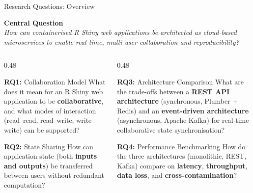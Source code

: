 \documentclass[aspectratio=169]{beamer}
\begin{document}
\begin{frame}{Research Questions: Overview}

\begin{center}
\large\textbf{Central Question}\\[0.5em]
\normalsize\textit{How can containerised R Shiny web applications be architected as cloud-based microservices to enable real-time, multi-user collaboration and reproducibility?}
\end{center}

\vspace{1em}

\begin{columns}[T]
\begin{column}{0.48\textwidth}
\begin{block}{\textbf{RQ1:} Collaboration Model}
What does it mean for an R Shiny web application to be \textbf{collaborative}, and what modes of interaction (read--read, read--write, write--write) can be supported?
\end{block}

\vspace{0.3em}
\begin{block}{\textbf{RQ2:} State Sharing}
How can application state (both \textbf{inputs and outputs}) be transferred between users without redundant computation?
\end{block}
\end{column}

\begin{column}{0.48\textwidth}
\begin{block}{\textbf{RQ3:} Architecture Comparison}
What are the trade-offs between a \textbf{REST API architecture} (synchronous, Plumber + Redis) and an \textbf{event-driven architecture} (asynchronous, Apache Kafka) for real-time collaborative state synchronisation?
\end{block}

\vspace{0.3em}
\begin{block}{\textbf{RQ4:} Performance Benchmarking}
How do the three architectures (monolithic, REST, Kafka) compare on \textbf{latency}, \textbf{throughput}, \textbf{data loss}, and \textbf{cross-contamination}?
\end{block}
\end{column}
\end{columns}

\end{frame}
\end{document}
